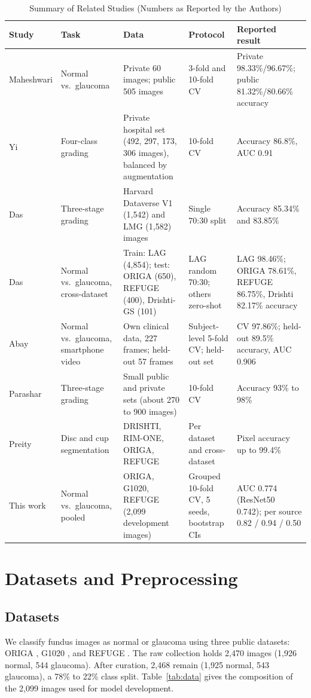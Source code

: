 \begin{table}[!t]
\caption{Summary of Related Studies (Numbers as Reported by the Authors)}
\label{tab:related}
\centering
\footnotesize
\begin{tabular}{p{2.3cm}p{2.6cm}p{4.6cm}p{3.0cm}p{3.7cm}}
\toprule
Study & Task & Data & Protocol & Reported result \\
\midrule
Maheshwari \cite{maheshwari2017} & Normal vs.\ glaucoma & Private 60 images; public 505 images & 3-fold and 10-fold CV & Private 98.33\%/96.67\%; public 81.32\%/80.66\% accuracy \\
Yi \cite{yi2023} & Four-class grading & Private hospital set (492, 297, 173, 306 images), balanced by augmentation & 10-fold CV & Accuracy 86.8\%, AUC 0.91 \\
Das \cite{das2023} & Three-stage grading & Harvard Dataverse V1 (1,542) and LMG (1,582) images & Single 70:30 split & Accuracy 85.34\% and 83.85\% \\
Das \cite{das2026} & Normal vs.\ glaucoma, cross-dataset & Train: LAG (4,854); test: ORIGA (650), REFUGE (400), Drishti-GS (101) & LAG random 70:30; others zero-shot & LAG 98.46\%; ORIGA 78.61\%, REFUGE 86.75\%, Drishti 82.17\% accuracy \\
Abay \cite{abay2026} & Normal vs.\ glaucoma, smartphone video & Own clinical data, 227 frames; held-out 57 frames & Subject-level 5-fold CV; held-out set & CV 97.86\%; held-out 89.5\% accuracy, AUC 0.906 \\
Parashar \cite{parashar2021a,parashar2021b,parashar2020} & Three-stage grading & Small public and private sets (about 270 to 900 images) & 10-fold CV & Accuracy 93\% to 98\% \\
Preity \cite{preity2026} & Disc and cup segmentation & DRISHTI, RIM-ONE, ORIGA, REFUGE & Per dataset and cross-dataset & Pixel accuracy up to 99.4\% \\
This work & Normal vs.\ glaucoma, pooled & ORIGA, G1020, REFUGE (2,099 development images) & Grouped 10-fold CV, 5 seeds, bootstrap CIs & AUC 0.774 (ResNet50 0.742); per source 0.82 / 0.94 / 0.50 \\
\bottomrule
\end{tabular}
\end{table}

\section{Datasets and Preprocessing}
\label{sec:data}
\subsection{Datasets}
We classify fundus images as normal or glaucoma using three public datasets: ORIGA \cite{zhang2010}, G1020 \cite{bajwa2020}, and REFUGE \cite{orlando2020}. The raw collection holds 2,470 images (1,926 normal, 544 glaucoma). After curation, 2,468 remain (1,925 normal, 543 glaucoma), a 78\% to 22\% class split. Table~\ref{tab:data} gives the composition of the 2,099 images used for model development.

